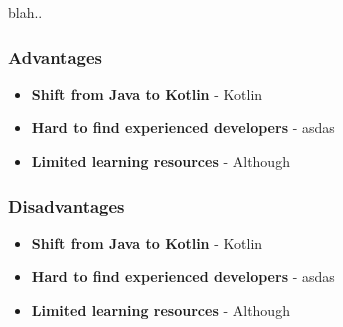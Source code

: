 blah..


\subsubsection{Advantages}
\begin{itemize}
    \item \textbf{Shift from Java to Kotlin} - Kotlin
    \item \textbf{Hard to find experienced developers} - asdas
    \item \textbf{Limited learning resources} - Although
\end{itemize}
\subsubsection{Disadvantages}
\begin{itemize}
    \item \textbf{Shift from Java to Kotlin} - Kotlin
    \item \textbf{Hard to find experienced developers} - asdas
    \item \textbf{Limited learning resources} - Although
\end{itemize}
